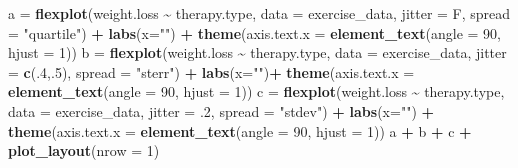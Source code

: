 \documentclass[
  man]{apa6}
\newenvironment{Shaded}{\begin{snugshade}}{\end{snugshade}}
\newcommand{\DataTypeTok}[1]{\textcolor[rgb]{0.13,0.29,0.53}{#1}}
\newcommand{\DecValTok}[1]{\textcolor[rgb]{0.00,0.00,0.81}{#1}}
\newcommand{\FloatTok}[1]{\textcolor[rgb]{0.00,0.00,0.81}{#1}}
\newcommand{\KeywordTok}[1]{\textcolor[rgb]{0.13,0.29,0.53}{\textbf{#1}}}
\newcommand{\NormalTok}[1]{#1}
\newcommand{\OperatorTok}[1]{\textcolor[rgb]{0.81,0.36,0.00}{\textbf{#1}}}
\newcommand{\StringTok}[1]{\textcolor[rgb]{0.31,0.60,0.02}{#1}}
\begin{document}
\begin{Shaded}
\begin{Highlighting}[]
\NormalTok{a =}\StringTok{ }\KeywordTok{flexplot}\NormalTok{(weight.loss }\OperatorTok{\textasciitilde{}}\StringTok{ }\NormalTok{therapy.type, }\DataTypeTok{data =}\NormalTok{ exercise\_data, }
              \DataTypeTok{jitter =}\NormalTok{ F, }\DataTypeTok{spread =} \StringTok{"quartile"}\NormalTok{) }\OperatorTok{+}
\StringTok{              }\KeywordTok{labs}\NormalTok{(}\DataTypeTok{x=}\StringTok{""}\NormalTok{) }\OperatorTok{+}\StringTok{ }
\StringTok{              }\KeywordTok{theme}\NormalTok{(}\DataTypeTok{axis.text.x =} \KeywordTok{element\_text}\NormalTok{(}\DataTypeTok{angle =} \DecValTok{90}\NormalTok{, }\DataTypeTok{hjust =} \DecValTok{1}\NormalTok{))}
\NormalTok{b =}\StringTok{ }\KeywordTok{flexplot}\NormalTok{(weight.loss }\OperatorTok{\textasciitilde{}}\StringTok{ }\NormalTok{therapy.type, }\DataTypeTok{data =}\NormalTok{ exercise\_data, }
              \DataTypeTok{jitter =} \KeywordTok{c}\NormalTok{(.}\DecValTok{4}\NormalTok{,.}\DecValTok{5}\NormalTok{), }\DataTypeTok{spread =} \StringTok{"sterr"}\NormalTok{) }\OperatorTok{+}
\StringTok{              }\KeywordTok{labs}\NormalTok{(}\DataTypeTok{x=}\StringTok{""}\NormalTok{)}\OperatorTok{+}
\StringTok{              }\KeywordTok{theme}\NormalTok{(}\DataTypeTok{axis.text.x =} \KeywordTok{element\_text}\NormalTok{(}\DataTypeTok{angle =} \DecValTok{90}\NormalTok{, }\DataTypeTok{hjust =} \DecValTok{1}\NormalTok{))  }
\NormalTok{c =}\StringTok{ }\KeywordTok{flexplot}\NormalTok{(weight.loss }\OperatorTok{\textasciitilde{}}\StringTok{ }\NormalTok{therapy.type, }\DataTypeTok{data =}\NormalTok{ exercise\_data, }
              \DataTypeTok{jitter =} \FloatTok{.2}\NormalTok{, }\DataTypeTok{spread =} \StringTok{"stdev"}\NormalTok{) }\OperatorTok{+}\StringTok{ }
\StringTok{              }\KeywordTok{labs}\NormalTok{(}\DataTypeTok{x=}\StringTok{""}\NormalTok{) }\OperatorTok{+}\StringTok{ }
\StringTok{              }\KeywordTok{theme}\NormalTok{(}\DataTypeTok{axis.text.x =} \KeywordTok{element\_text}\NormalTok{(}\DataTypeTok{angle =} \DecValTok{90}\NormalTok{, }\DataTypeTok{hjust =} \DecValTok{1}\NormalTok{))  }
\NormalTok{a }\OperatorTok{+}\StringTok{ }\NormalTok{b }\OperatorTok{+}\StringTok{ }\NormalTok{c }\OperatorTok{+}\StringTok{ }\KeywordTok{plot\_layout}\NormalTok{(}\DataTypeTok{nrow =} \DecValTok{1}\NormalTok{)}
\end{Highlighting}
\end{Shaded}
\end{document}
